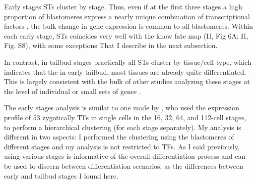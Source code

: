 Early stages STs cluster by stage. Thus, even if at the first three stages a high proportion of blastomeres express a nearly unique combination of transcriptional factors \citep{Imai2006}, the bulk change in gene expression is common to all blastomeres. Within each early stage, STs coincides very well with the know fate map (II, Fig 6A; II, Fig. S8), with some exceptions That I describe in the next subsection.

In contrast, in tailbud stages practically all STs cluster by tissue/cell type, which indicates that the in early tailbud, most tissues are already quite differentiated.
This is largely consistent with the bulk of other studies analyzing these stages at the level of individual or small sets of genes \citep{Corbo1997,DiGregorio1999}.

The early stages analysis is similar to one made by \citet{Imai2006}, who used the expression profile of 53 zygotically TFs in single cells in the 16, 32, 64, and 112-cell stages, to perform a hierarchical clustering (for each stage separately). My analysis is different in two aspects: I performed the clustering using the blastomeres of different stages and my analysis is not restricted to TFs. As I said previously, using various stages is informative of the overall differentiation process and can be used to discern between differentiation scenarios, as the differences between early and tailbud stages I found here.

